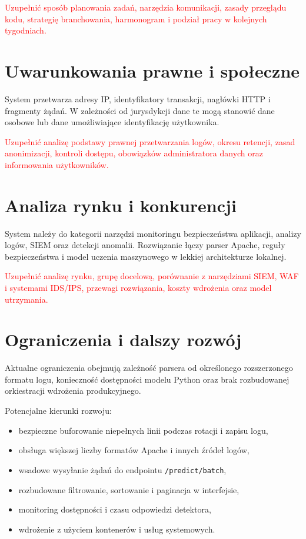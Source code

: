 \documentclass[12pt,a4paper]{article}
\newcommand\todo[1]{\textcolor{red}{#1}}
\newcommand{\code}[1]{\texttt{#1}}
\begin{document}
\todo{Uzupełnić sposób planowania zadań, narzędzia komunikacji, zasady przeglądu
kodu, strategię branchowania, harmonogram i podział pracy w kolejnych tygodniach.}

\section{Uwarunkowania prawne i społeczne}

System przetwarza adresy IP, identyfikatory transakcji, nagłówki HTTP i fragmenty
żądań. W zależności od jurysdykcji dane te mogą stanowić dane osobowe lub dane
umożliwiające identyfikację użytkownika.

\todo{Uzupełnić analizę podstawy prawnej przetwarzania logów, okresu retencji,
zasad anonimizacji, kontroli dostępu, obowiązków administratora danych oraz
informowania użytkowników.}

\section{Analiza rynku i konkurencji}

System należy do kategorii narzędzi monitoringu bezpieczeństwa aplikacji,
analizy logów, SIEM oraz detekcji anomalii. Rozwiązanie łączy parser Apache,
reguły bezpieczeństwa i model uczenia maszynowego w lekkiej architekturze
lokalnej.

\todo{Uzupełnić analizę rynku, grupę docelową, porównanie z narzędziami SIEM,
WAF i systemami IDS/IPS, przewagi rozwiązania, koszty wdrożenia oraz model
utrzymania.}

\section{Ograniczenia i dalszy rozwój}

Aktualne ograniczenia obejmują zależność parsera od określonego rozszerzonego
formatu logu, konieczność dostępności modelu Python oraz brak rozbudowanej
orkiestracji wdrożenia produkcyjnego.

Potencjalne kierunki rozwoju:
\begin{itemize}
    \item bezpieczne buforowanie niepełnych linii podczas rotacji i zapisu logu,
    \item obsługa większej liczby formatów Apache i innych źródeł logów,
    \item wsadowe wysyłanie żądań do endpointu \code{/predict/batch},
    \item rozbudowane filtrowanie, sortowanie i paginacja w interfejsie,
    \item monitoring dostępności i czasu odpowiedzi detektora,
    \item wdrożenie z użyciem kontenerów i usług systemowych.
\end{itemize}
\end{document}
